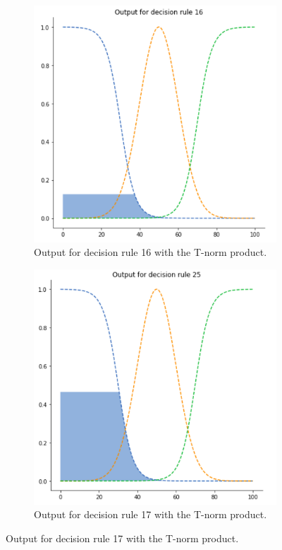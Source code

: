 \documentclass[conference]{IEEEtran}
\begin{document}
\begin{figure}[ht]
\begin{subfigure}{.5\textwidth}
  \centering
  \includegraphics[width=.8\linewidth]{figures/first/prod1.png}  
  \caption{Output for decision rule 16 with the T-norm product.}
  \label{fig:1prod1}
\end{subfigure}
\begin{subfigure}{.5\textwidth}
  \centering
  \includegraphics[width=.8\linewidth]{figures/first/prod2.png}  
  \caption{Output for decision rule 17 with the T-norm product.}
  \label{fig:1prod2}
\end{subfigure}

\end{figure}
\end{document}
